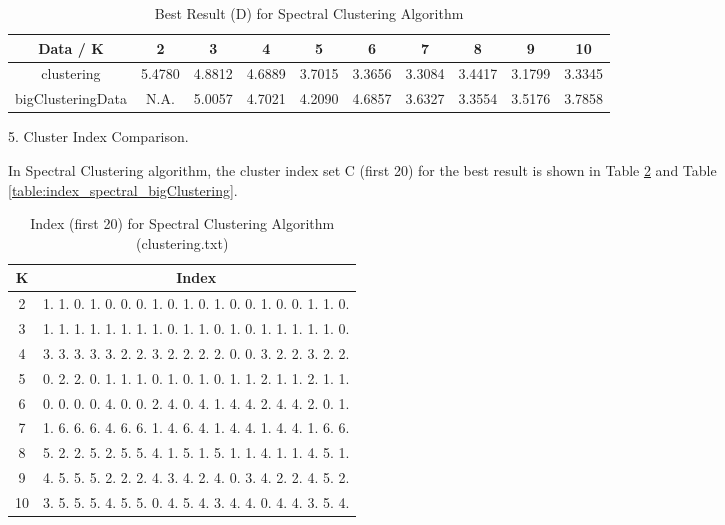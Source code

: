 \begin{description}
\begin{description}
\begin{table}[H]
	\centering
	\caption{Best Result (D) for Spectral Clustering Algorithm}
	\label{table:best_spectral}	
	\begin{tabular}{ c | c | c | c | c | c | c | c | c | c}
		\hline \hline
		Data / K      & 2     &    3    & 4    & 5     & 6    & 7    & 8   & 9    & 10 \\[0.1cm]
		\hline
	clustering	        & 5.4780 &    4.8812 & 4.6889 & 3.7015 & 3.3656 & 3.3084 & 3.4417 & 3.1799 & 3.3345 \\[0.1cm]
bigClusteringData & N.A. &    5.0057 & 4.7021 & 4.2090 & 4.6857 & 3.6327 & 3.3554 & 3.5176 & 3.7858 \\[0.1cm]
		\hline	
	\end{tabular}
\end{table}

\item{5.} Cluster Index Comparison.

In Spectral Clustering algorithm, the cluster index set C (first 20) for the best result is shown in Table \ref{table:index_spectral_clustering} and Table \ref{table:index_spectral_bigClustering}.

\begin{table}[H]
	\centering
	\caption{Index (first 20) for Spectral Clustering Algorithm (clustering.txt)}
	\label{table:index_spectral_clustering}	
	\begin{tabular}{ c | c }
		\hline \hline
		K        &    Index  \\[0.1cm]
		\hline
		2     &  1.  1.  0.  1.  0.  0.  0.  1.  0.  1.  0.  1.  0.  0.  1.  0.  0.  1.  1.  0. \\[0.1cm]
		3     &  1.  1.  1.  1.  1.  1.  1.  1.  0.  1.  1.  0.  1.  0.  1.  1.  1.  1.  1.  0. \\[0.1cm]
		4     &  3.  3.  3.  3.  3.  2.  2.  3.  2.  2.  2.  2.  0.  0.  3.  2.  2.  3.  2.  2. \\[0.1cm]
		5     &  0.  2.  2.  0.  1.  1.  1.  0.  1.  0.  1.  0.  1.  1.  2.  1.  1.  2.  1.  1. \\[0.1cm]
		6     &  0.  0.  0.  0.  4.  0.  0.  2.  4.  0.  4.  1.  4.  4.  2.  4.  4.  2.  0.  1. \\[0.1cm]
		7     &  1.  6.  6.  6.  4.  6.  6.  1.  4.  6.  4.  1.  4.  4.  1.  4.  4.  1.  6.  6. \\[0.1cm]
		8     &  5.  2.  2.  5.  2.  5.  5.  4.  1.  5.  1.  5.  1.  1.  4.  1.  1.  4.  5.  1. \\[0.1cm]
		9     &  4.  5.  5.  5.  2.  2.  2.  4.  3.  4.  2.  4.  0.  3.  4.  2.  2.  4.  5.  2. \\[0.1cm]
		10   &  3.  5.  5.  5.  4.  5.  5.  0.  4.  5.  4.  3.  4.  4.  0.  4.  4.  3.  5.  4. \\[0.1cm]
		\hline	
	\end{tabular}
\end{table}


\end{description}
\end{description}
